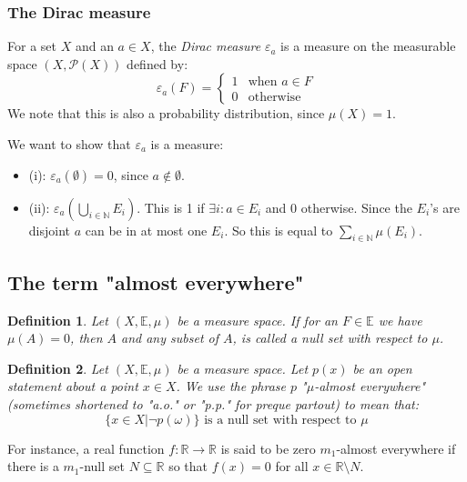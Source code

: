 \documentclass[12pt, a4paper]{article}
\newtheorem{definition}{Definition}[section]
\numberwithin{equation}{section}
\begin{document}
\subsubsection{The Dirac measure}
For a set $X$ and an $a\in X$, the \textit{Dirac measure} $\varepsilon_a$ is a measure on the measurable space $(X,\mathcal{P}(X))$ defined by:
\begin{equation}
\varepsilon_a(F)=
\begin{cases}
1	& \textrm{when }a\in F \\
0	& \textrm{otherwise}
\end{cases}
\end{equation}
We note that this is also a probability distribution, since $\mu(X)=1$.

We want to show that $\varepsilon_a$ is a measure:
\begin{itemize}
\item (i): $\varepsilon_a(\emptyset)=0$, since $a\notin\emptyset$.
\item (ii): $\varepsilon_a\left(\bigcup_{i\in\mathbb{N}} E_i\right)$. This is 1 if $\exists i: a\in E_i$ and 0 otherwise. Since the $E_i$'s are disjoint $a$ can be in at most one $E_i$. So this is equal to $\sum_{i\in\mathbb{N}}\mu(E_i)$.
\end{itemize}

\subsection{The term "almost everywhere"}
\begin{definition}
Let $(X,\mathbb{E},\mu)$ be a measure space. If for an $F\in\mathbb{E}$ we have $\mu(A)=0$, then $A$ and any subset of $A$, is called a null set with respect to $\mu$.
\end{definition}

\begin{definition}
Let $(X,\mathbb{E},\mu)$ be a measure space. Let $p(x)$ be an open statement about a point $x\in X$. We use the phrase $p$ "$\mu$-almost everywhere" (sometimes shortened to "a.o." or "p.p." for preque partout) to mean that:
\begin{equation}
\{x\in X|\neg p(\omega)\}\textrm{ is a null set with respect to }\mu
\end{equation}
\end{definition}

For instance, a real function $f: \mathbb{R}\rightarrow\mathbb{R}$ is said to be zero $m_1$-almost everywhere if there is a $m_1$-null set $N\subseteq\mathbb{R}$ so that $f(x)=0$ for all $x\in\mathbb{R}\setminus N$.
\end{document}
